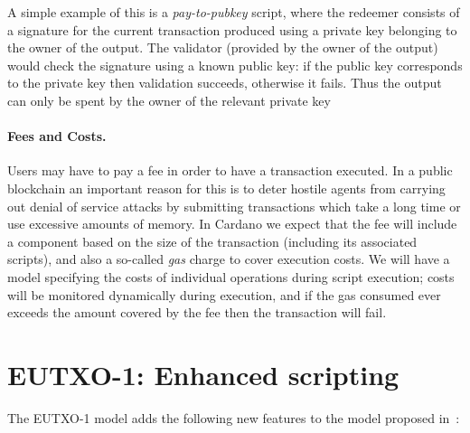 \documentclass[a4paper]{article}
\renewcommand{\i}{\textit}  %
\theoremstyle{definition}  %
\begin{document}
A simple example of this is a \i{pay-to-pubkey} script, where the
redeemer consists of a signature for the current transaction produced
using a private key belonging to the owner of the output.  The
validator (provided by the owner of the output) would check the
signature using a known public key: if the public key corresponds to
the private key then validation succeeds, otherwise it fails.  Thus
the output can only be spent by the owner of the relevant private key

\paragraph{Fees and Costs.}
\label{sec:costs} Users may have to pay a fee in order to have a
transaction executed.  In a public blockchain an important reason for
this is to deter hostile agents from carrying out denial of service
attacks by submitting transactions which take a long time or use
excessive amounts of memory.  In Cardano we expect that the fee will
include a component based on the size of the transaction (including
its associated scripts), and also a so-called \textit{gas} charge to
cover execution costs.  We will have a model specifying the costs of
individual operations during script execution; costs will be monitored
dynamically during execution, and if the gas consumed ever exceeds the
amount covered by the fee then the transaction will fail.


\section{EUTXO-1: Enhanced scripting}
\label{sec:eutxo-1}
The EUTXO-1 model adds the following new features to the model 
proposed in~\citep{Zahnentferner18-UTxO}:
\end{document}

